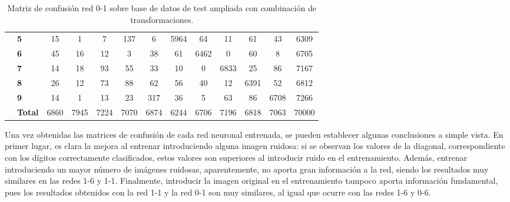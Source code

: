 \begin{description}
\begin{table}[H]
\begin{tabular}{|c|l|c|c|c|c|c|c|c|c|c|c|c|}
			& \textbf{5} & 15 & 1 & 7 & 137 & 6 & \cellcolor{lightgray}5964 & 64 & 11 & 61 & 43 & 6309\\ \cline{2-13}
			& \textbf{6} & 45 & 16 & 12 & 3 & 38 & 61 & \cellcolor{lightgray}6462 & 0 & 60 & 8 & 6705\\ \cline{2-13}
			& \textbf{7} & 14 & 18 & 93 & 55 & 33 & 10 & 0 & \cellcolor{lightgray}6833 & 25 & 86 & 7167\\ \cline{2-13}
			& \textbf{8} & 26 & 12 & 73 & 88 & 62 & 56 & 40 & 12 & \cellcolor{lightgray}6391 & 52 & 6812\\ \cline{2-13}
			& \textbf{9} & 14 & 1 & 13 & 23 & 317 & 36 & 5 & 63 & 86 & \cellcolor{lightgray}6708 & 7266\\ \cline{2-13}
			& \textbf{Total} & 6860 & 7945 & 7224 & 7070 & 6874 & 6244 & 6706 & 7196 & 6818 & 7063 & 70000\\ \hline
		\end{tabular}
		\caption{Matriz de confusión red 0-1 sobre base de datos de test ampliada con combinación de transformaciones.}
		\label{tab.matriz0-1}
	\end{table}
\end{description}

Una vez obtenidas las matrices de confusión de cada red neuronal entrenada, se pueden establecer algunas conclusiones a simple vista. En primer lugar, es clara la mejora al entrenar introduciendo alguna imagen ruidosa: si se observan los valores de la diagonal, correspondiente con los dígitos correctamente clasificados, estos valores son superiores al introducir ruido en el entrenamiento. Además, entrenar introduciendo un mayor número de imágenes ruidosas, aparentemente, no aporta gran información a la red, siendo los resultados muy similares en las redes 1-6 y 1-1. Finalmente, introducir la imagen original en el entrenamiento tampoco aporta información fundamental, pues los resultados obtenidos con la red 1-1 y la red 0-1 son muy similares, al igual que ocurre con las redes 1-6 y 0-6.\\

